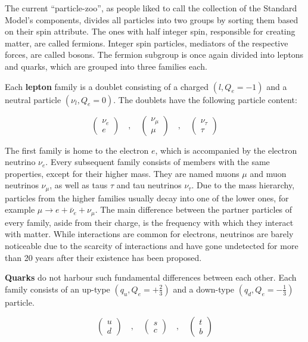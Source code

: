 \noindent The current ``particle-zoo'', as people liked to call the collection of the Standard Model's components, divides all particles into two groups by sorting them based on their spin attribute. The ones with half integer spin, responsible for creating matter, are called fermions. Integer spin particles, mediators of the respective forces, are called bosons. The fermion subgroup is once again divided into leptons and quarks, which are grouped into three families each.

Each \textbf{lepton} family is a doublet consisting of a charged $( l, Q_e = -1 )$ and a neutral particle $( \nu_l, Q_e = 0 )$. The doublets have the following particle content:

\begin{equation*}
  \begin{pmatrix}
    \nu_e \\
    e
  \end{pmatrix}
  \quad , \quad
  \begin{pmatrix}
    \nu_\mu \\
    \mu
  \end{pmatrix}
  \quad , \quad
  \begin{pmatrix}
    \nu_\tau \\
    \tau
  \end{pmatrix}
\end{equation*}

The first family is home to the electron $e$, which is accompanied by the electron neutrino $\nu_e$. Every subsequent family consists of members with the same properties, except for their higher mass. They are named muons $\mu$ and muon neutrinos $\nu_\mu$, as well as taus $\tau$ and tau neutrinos $\nu_\tau$. Due to the mass hierarchy, particles from the higher families usually decay into one of the lower ones, for example $\mu \rightarrow e + \bar{\nu}_e + \nu_\mu$. The main difference between the partner particles of every family, aside from their charge, is the frequency with which they interact with matter. While interactions are common for electrons, neutrinos are barely noticeable due to the scarcity of interactions and have gone undetected for more than 20 years after their existence has been proposed.

\textbf{Quarks} do not harbour such fundamental differences between each other. Each family consists of an up-type $( q_u, Q_e = +\frac{2}{3} )$ and a down-type $( q_d, Q_e = -\frac{1}{3} )$ particle. 

\begin{equation*}
  \begin{pmatrix}
    u \\
    d
  \end{pmatrix}
  \quad , \quad
  \begin{pmatrix}
    s \\
    c
  \end{pmatrix}
  \quad , \quad
  \begin{pmatrix}
    t \\
    b
  \end{pmatrix}
\end{equation*}

